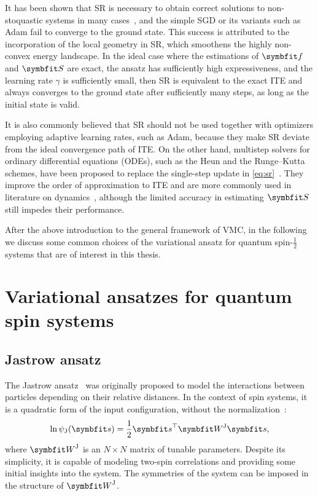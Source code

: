 It has been shown that SR is necessary to obtain correct solutions to non-stoquastic systems in many cases~\cite{carleo2017solving, choo2019two, bukov2021learning}, and the simple SGD or its variants such as Adam fail to converge to the ground state. This success is attributed to the incorporation of the local geometry in SR, which smoothens the highly non-convex energy landscape. In the ideal case where the estimations of $\vf$ and $\mS$ are exact, the ansatz has sufficiently high expressiveness, and the learning rate $\gamma$ is sufficiently small, then SR is equivalent to the exact ITE and always converges to the ground state after sufficiently many steps, as long as the initial state is valid.

It is also commonly believed that SR should not be used together with optimizers employing adaptive learning rates, such as Adam, because they make SR deviate from the ideal convergence path of ITE. On the other hand, multistep solvers for ordinary differential equations (ODEs), such as the Heun and the Runge--Kutta schemes, have been proposed to replace the single-step update in \cref{eq:sr}~\cite{bukov2021learning}. They improve the order of approximation to ITE and are more commonly used in literature on dynamics~\cite{schmitt2020quantum}, although the limited accuracy in estimating $\mS$ still impedes their performance.

After the above introduction to the general framework of VMC, in the following we discuss some common choices of the variational ansatz for quantum spin-$\frac{1}{2}$ systems that are of interest in this thesis.

\section{Variational ansatzes for quantum spin systems}

\subsection{Jastrow ansatz}
\label{sec:jastrow}

The Jastrow ansatz~\cite{jastrow1955many} was originally proposed to model the interactions between particles depending on their relative distances. In the context of spin systems, it is a quadratic form of the input configuration, without the normalization~\cite{huse1988simple}:
\begin{equation}
\ln \psi_\text{J}(\vs) = \frac{1}{2} \vs^\transpose \mW^\text{J} \vs,
\end{equation}
where $\mW^\text{J}$ is an $N \times N$ matrix of tunable parameters. Despite its simplicity, it is capable of modeling two-spin correlations and providing some initial insights into the system. The symmetries of the system can be imposed in the structure of $\mW^\text{J}$.

